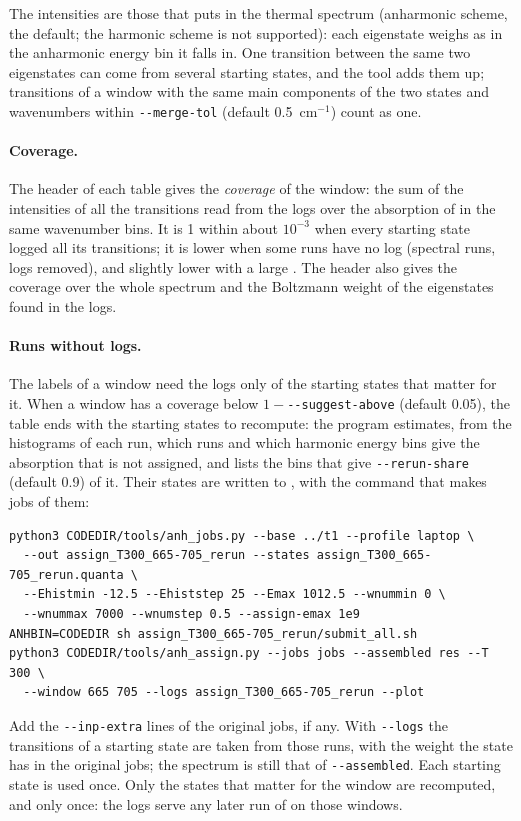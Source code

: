 The intensities are those that  puts in the
thermal spectrum (anharmonic scheme, the default; the harmonic scheme is
not supported): each eigenstate weighs as in the anharmonic energy bin it
falls in. One transition between the same two eigenstates can come from
several starting states, and the tool adds them up; transitions of a
window with the same main components of the two states and wavenumbers
within \texttt{-{}-merge-tol} (default 0.5~cm$^{-1}$) count as one.

\paragraph{Coverage.} The header of each table gives the
\emph{coverage} of the window: the sum of the intensities of all the
transitions read from the logs over the absorption of
 in the same wavenumber bins. It is 1 within
about $10^{-3}$ when every starting state logged all its transitions; it
is lower when some runs have no log (spectral runs, logs removed), and
slightly lower with a large . The header also gives the
coverage over the whole spectrum and the Boltzmann weight of the
eigenstates found in the logs.

\paragraph{Runs without logs.} The labels of a window need the logs only
of the starting states that matter for it. When a window has a coverage
below $1-{}$\texttt{-{}-suggest-above} (default 0.05), the table ends
with the starting states to recompute: the program estimates, from the
histograms of each run, which runs and which harmonic energy bins give
the absorption that is not assigned, and lists the bins that give
\texttt{-{}-rerun-share} (default 0.9) of it. Their states are written
to , with the command that makes
jobs of them:
\begin{lstlisting}
python3 CODEDIR/tools/anh_jobs.py --base ../t1 --profile laptop \
  --out assign_T300_665-705_rerun --states assign_T300_665-705_rerun.quanta \
  --Ehistmin -12.5 --Ehiststep 25 --Emax 1012.5 --wnummin 0 \
  --wnummax 7000 --wnumstep 0.5 --assign-emax 1e9
ANHBIN=CODEDIR sh assign_T300_665-705_rerun/submit_all.sh
python3 CODEDIR/tools/anh_assign.py --jobs jobs --assembled res --T 300 \
  --window 665 705 --logs assign_T300_665-705_rerun --plot
\end{lstlisting}
Add the \texttt{-{}-inp-extra} lines of the original jobs, if any. With
\texttt{-{}-logs} the transitions of a starting state are taken from those
runs, with the weight the state has in the original jobs; the spectrum is
still that of \texttt{-{}-assembled}. Each starting state is used once.
Only the states that matter for the window are recomputed, and only once:
the logs serve any later run of \prog{anh\_assign.py} on those windows.

